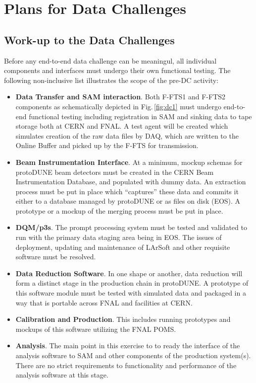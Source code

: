 \documentclass[pdftex,12pt,letter]{article}
\newcommand{\pd}{protoDUNE\xspace}
\begin{document}
\section{Plans for Data Challenges}
\subsection{Work-up to the Data Challenges}
Before any end-to-end data challenge can be meaningul, all individual components and interfaces must undergo
their own functional testing. The following non-inclusive list illustrates the scope of the pre-DC activity:
\begin{itemize}

\item \textbf{Data Transfer and SAM interaction}.  Both F-FTS1 and F-FTS2 components as schematically depicted in Fig.\,\ref{fig:dc1}
must undergo end-to-end functional testing including registration in SAM and sinking data to tape storage both at CERN and FNAL. A test
agent will be created which simulates creation of the raw data files by DAQ, which are written to the Online Buffer and picked up
by the F-FTS for transmission.

\item \textbf{Beam Instrumentation Interface}. At a minimum, mockup schemas for \pd beam detectors must be created in
the CERN Beam Instrumentation Database, and populated with dummy data. An extraction process must be put in place which
``captures'' these data and commits it either to a database managed by \pd or as files on disk (EOS). A prototype or a mockup
of the merging process must be put in place.

\item  \textbf{DQM/p3s}. The prompt processing system must be tested and validated to run with the primary data
staging area being in EOS. The issues of deployment, updating and maintenance of LArSoft and other requisite software
must be resolved.

\item  \textbf{Data Reduction Software}. In one shape or another, data reduction will form a distinct stage in the production chain
in \pd. A prototype of this software module must be tested with simulated data and packaged in a way that is portable across
FNAL and facilities at CERN.

\item  \textbf{Calibration and Production}. This includes running prototypes and mockups of this software utilizing the FNAL POMS.

\item  \textbf{Analysis}. The main point in this exercise to to ready the interface of the analysis software to SAM and other
components of the production system(s). There are no strict requirements to functionality and performance of the analysis
software at this stage.

\end{itemize}
\end{document}
